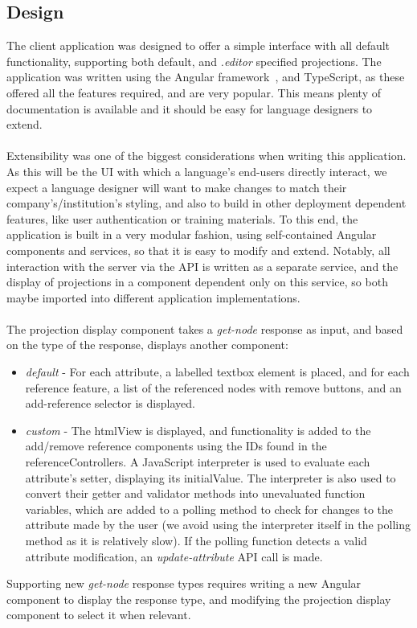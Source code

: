\documentclass{article}
\begin{document}
{%

\subsection{Design}
The client application was designed to offer a simple interface with all default functionality, supporting both default, and \emph{.editor} specified projections. The application was written using the Angular framework~\cite{angular}, and TypeScript, as these offered all the features required, and are very popular. This means plenty of documentation is available and it should be easy for language designers to extend.
\\
\\
Extensibility was one of the biggest considerations when writing this application. As this will be the UI with which a language's end-users directly interact, we expect a language designer will want to make changes to match their company's/institution's styling, and also to build in other deployment dependent features, like user authentication or training materials. To this end, the application is built in a very modular fashion, using self-contained Angular components and services, so that it is easy to modify and extend. Notably, all interaction with the server via the API is written as a separate service, and the display of projections in a component dependent only on this service, so both maybe imported into different application implementations. 
\\
\\
The projection display component takes a \emph{get-node} response as input, and based on the type of the response, displays another component:
\begin{itemize}
\item \emph{default} - For each attribute, a labelled textbox element is placed, and for each reference feature, a list of the referenced nodes with remove buttons, and an add-reference selector is displayed.
\item \emph{custom} - The htmlView is displayed, and functionality is added to the add/remove reference components using the IDs found in the referenceControllers. A JavaScript interpreter is used to evaluate each attribute's setter, displaying its initialValue. The interpreter is also used to convert their getter and validator methods into unevaluated function variables, which are added to a polling method to check for changes to the attribute made by the user (we avoid using the interpreter itself in the polling method as it is relatively slow). If the polling function detects a valid attribute modification, an \emph{update-attribute} API call is made.
\end{itemize}
Supporting new \emph{get-node} response types requires writing a new Angular component to display the response type, and modifying the projection display component to select it when relevant.
}
\end{document}
